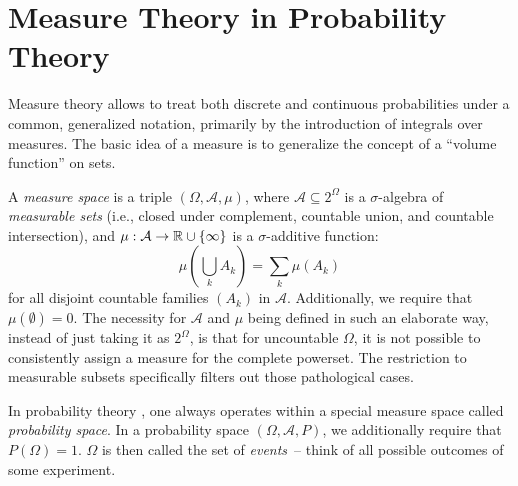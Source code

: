 \chapter{Measure Theory in Probability Theory}
\label{ch:measure-theory}

Measure theory \parencites{tao2011introduction}[section 10.5]{bronstein1995taschenbuch} allows to treat both
discrete and continuous probabilities under a common, generalized notation, primarily by the
introduction of integrals over measures.  The basic idea of a measure is to generalize the concept
of a \enquote{volume function} on sets.

A \emph{measure space} is a triple \((\Omega, \mathcal{A}, \mu)\), where
\(\mathcal{A} \subseteq 2^{\Omega}\) is a \(\sigma\)-algebra of \emph{measurable sets} (i.e., closed
under complement, countable union, and countable intersection), and
\(\mu: \mathcal{A} \to \mathbb{R} \cup \{\infty\}\) is a \(\sigma\)-additive function:
\begin{equation}
  \label{eq:sigma-additivity}
  \mu\left( \bigcup_{k} A_k \right) = \sum_{k} \mu(A_k)
\end{equation}
for all disjoint countable families \((A_k)\) in \(\mathcal{A}\).  Additionally, we require that
\(\mu(\emptyset) = 0\).  The necessity for \(\mathcal{A}\) and \(\mu\) being defined in such an
elaborate way, instead of just taking it as \(2^{\Omega}\), is that for uncountable \(\Omega\), it
is not possible to consistently assign a measure for the complete powerset.  The restriction to
measurable subsets specifically filters out those pathological cases.

In probability theory \parencite{kallenberg2006foundations}, one always operates within a special
measure space called \emph{probability space}.  In a probability space \((\Omega, \mathcal{A}, P)\),
we additionally require that \(P(\Omega) = 1\).  \(\Omega\) is then called the set of
\emph{events}~-- think of all possible outcomes of some experiment. 

